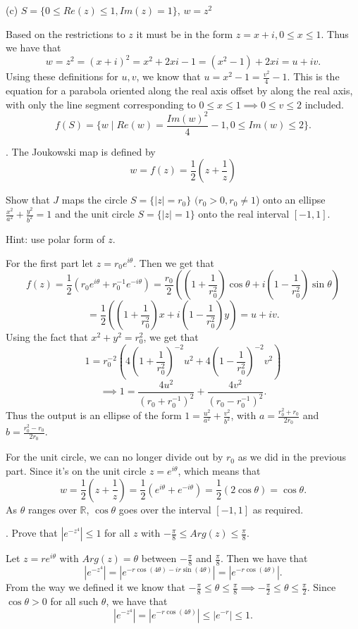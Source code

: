 \documentclass[letterpaper, reqno,11pt]{article}
\begin{document}
(c) $S= \{ 0\leq Re(z) \leq 1, Im (z)=1 \}$, $ w=z^2$

Based on the restrictions to $z$ it must be in the form $z=x+i, 0\leq x\leq 1$. Thus we have that 
\[
w=z^2=(x+i)^2=x^2+2xi-1=(x^2-1)+2xi=u+iv
.\]
Using these definitions for $u,v$, we know that $u=x^2-1=\frac{v^2}{4}-1$. This is the equation for a parabola oriented along the real axis offset by along the real axis, with only the line segment corresponding to $0\leq x\leq 1\implies 0\leq v\leq 2$ included. 
\[
f(S)=\{w\mid Re(w)=\frac{Im(w)^2}{4}-1, 0\leq Im(w)\leq 2\} 
.\]

\medskip

. The Joukowski map is defined by
$$ w=f(z)= \frac{1}{2} (z+\frac{1}{z} )$$


Show that $J$ maps the circle $ S=\{ |z|=r_0\}$ $(r_0>0, r_0\not =1$) onto an ellipse  $\frac{x^2}{a^2}+\frac{y^2}{b^2}=1$ and the unit circle $ S=\{ |z|=1\}$ onto the real interval $ [-1,1]$.

Hint: use polar form of $z$.

\medskip

For the first part let $z=r_0e^{i\theta}$. Then we get that 
\[
f(z)=\frac{1}{2}\left( r_0e^{i\theta}+r_0^{-1}e^{-i\theta} \right) =\frac{r_0}{2}\left( (1+\frac{1}{r_0^2})\cos\theta+i(1-\frac{1}{r_0^2})\sin\theta \right)
\]
\[
 =\frac{1}{2}\left( (1+\frac{1}{r_0^2})x+i(1-\frac{1}{r_0^2})y\right)=u+iv
.\]
Using the fact that $x^2+y^2=r_0^2$, we get that 
\[
1=r_0^{-2}\left( 4\left( 1+\frac{1}{r_0^2} \right)^{-2}u^2+4\left( 1-\frac{1}{r_0^2} \right)^{-2}v^2  \right)
\]
\[
\implies 1=\frac{4u^2}{(r_0+r_0^{-1})^2}+\frac{4v^2}{(r_0-r_0^{-1})^2}
.\]
Thus the output is an ellipse of the form $1=\frac{u^2}{ a^2}+\frac{v^2}{b^2}$, with $a=\frac{r_0^2+r_0}{2r_0}$ and $b=\frac{r_0^2-r_0}{ 2r_0}$. 

For the unit circle, we can no longer divide out by $r_0$ as we did in the previous part. Since it's on the unit circle $z=e^{i\theta}$, which means that 
\[
w=\frac{1}{2}\left(z+\frac{1}{z}\right)=\frac{1}{2}\left( e^{i\theta}+e^{-i\theta} \right) =\frac{1}{2}(2\cos\theta)=\cos\theta
.\]
As $\theta$ ranges over $\mathbb{R}$, $\cos\theta$ goes over the interval $[-1, 1]$ as required. 

\medskip

. Prove that $ |e^{-z^4}|\leq 1$ for all $z$ with $ -\frac{\pi}{8} \leq Arg (z) \leq \frac{\pi}{8}$.

\medskip

Let $z=re^{i\theta}$ with $Arg(z)=\theta$ between $-\frac{\pi}{8}$ and $\frac{\pi}{8}$. Then we have that 
\[
\left|e^{-z^{4}}\right|=\left|e^{-r\cos(4\theta)-ir \sin(4\theta)}\right|=\left| e^{-r\cos(4\theta)} \right| 
.\]
From the way we defined it we know that $-\frac{\pi}{8}\leq\theta\leq\frac{\pi}{8}\implies -\frac{\pi}{2}\leq\theta\leq\frac{\pi}{2}$. Since $\cos\theta>0$ for all such $\theta$, we have that 
\[
\left| e^{-z^{4}} \right| =\left| e^{-r\cos(4\theta)} \right| \leq \left| e^{-r} \right|\leq 1
.\]
\end{document}
